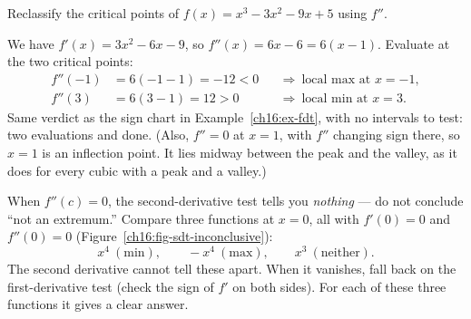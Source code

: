 \begin{example}\label{ch16:ex-sdt}
Reclassify the critical points of $f(x)=x^3-3x^2-9x+5$ using $f''$.

\smallskip
We have $f'(x)=3x^2-6x-9$, so $f''(x)=6x-6=6(x-1)$. Evaluate at the two critical
points:
\[
\begin{aligned}
f''(-1)&=6(-1-1)=-12<0 &&\Rightarrow\ \text{local max at }x=-1,\\
f''(3)&=6(3-1)=12>0 &&\Rightarrow\ \text{local min at }x=3.
\end{aligned}
\]
Same verdict as the sign chart in Example~\ref{ch16:ex-fdt}, with no intervals to
test: two evaluations and done. (Also, $f''=0$ at $x=1$, with
$f''$ changing sign there, so $x=1$ is an inflection point. It lies midway between
the peak and the valley, as it does for every cubic with a peak and a valley.)
\end{example}

\begin{trapbox}
When $f''(c)=0$, the second-derivative test tells you \emph{nothing} --- do not
conclude ``not an extremum.'' Compare three functions at $x=0$, all with $f'(0)=0$
and $f''(0)=0$ (Figure~\ref{ch16:fig-sdt-inconclusive}):
\[
x^4 \ (\text{min}),\qquad -x^4 \ (\text{max}),\qquad x^3 \ (\text{neither}).
\]
The second derivative cannot tell these apart. When it vanishes, fall back on the
first-derivative test (check the sign of $f'$ on both sides). For each of these
three functions it gives a clear answer.
\end{trapbox}

